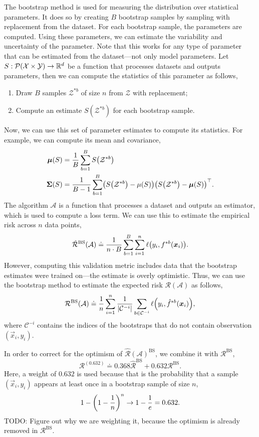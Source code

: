 The bootstrap method is used for measuring the distribution over statistical parameters. It does so
by creating $B$ bootstrap samples by sampling with replacement from the dataset. For each bootstrap
sample, the parameters are computed. Using these parameters, we can estimate the variability and
uncertainty of the parameter. Note that this works for any type of parameter that can be estimated
from the dataset---not only model parameters. Let $S: \mathcal{P}(\mathcal{X} \times \mathcal{Y})
    \to \mathbb{R}^d$ be a function that processes datasets and outputs parameters, then we can compute the
statistics of this parameter as follows,
\begin{enumerate}
    \item Draw $B$ samples $\mathcal{Z}^{*b}$ of size $n$ from $\mathcal{Z}$ with replacement;
    \item Compute an estimate $S(\mathcal{Z}^{*b})$ for each bootstrap sample.
\end{enumerate}
Now, we can use this set of parameter estimates to compute its statistics. For example, we can compute its mean and covariance,
\begin{align*}
    \vec{\mu}(S)    & = \frac{1}{B} \sum_{b=1}^{B} S\lft(\mathcal{Z}^{*b}\rgt)                                                                                             \\
    \mat{\Sigma}(S) & = \frac{1}{B-1} \sum_{b=1}^{B}  \lft( S\lft(\mathcal{Z}^{*b}\rgt) - \mu(S) \rgt) \transpose{\lft( S\lft(\mathcal{Z}^{*b}\rgt) - \vec{\mu}(S) \rgt)}.
\end{align*}
The algorithm $\mathcal{A}$ is a function that processes a dataset and outputs an estimator, which
is used to compute a loss term. We can use this to estimate the empirical risk across $n$ data
points, \[
    \hat{\mathcal{R}}^{\mathrm{BS}}(\mathcal{A}) \doteq \frac{1}{n \cdot B} \sum_{b=1}^{B} \sum_{i=1}^{n} \ell\lft(y_i, f^{*b}\lft(\vec{x}_i\rgt)\rgt).
\]
However, computing this validation metric includes data that the bootstrap estimates were trained
on---the estimate is overly optimistic. Thus, we can use the bootstrap method to estimate the
expected risk $\mathcal{R}(\mathcal{A})$ as follows, \[
    \mathcal{R}^{\mathrm{BS}}(\mathcal{A}) \doteq \frac{1}{n} \sum_{i=1}^{n} \frac{1}{|\mathcal{C}^{-i}|} \sum_{b \in \mathcal{C}^{-i}} \ell\lft(y_i, \hat{f}^{*b}\lft(\vec{x}_i\rgt)\rgt),
\]
where $\mathcal{C}^{-i}$ contains the indices of the bootstraps that do not contain observation
$(\vec{x}_i, y_i)$.

In order to correct for the optimism of $\hat{\mathcal{R}}(\mathcal{A})^{\mathrm{BS}}$, we combine
it with $\mathcal{R}^{\mathrm{BS}}$, \[
    \mathcal{R}^{(0.632)} \doteq 0.368 \hat{\mathcal{R}}^{\mathrm{BS}} + 0.632 \mathcal{R}^{\mathrm{BS}}.
\]
Here, a weight of $0.632$ is used because that is the probability that a sample $(\vec{x}_i, y_i)$
appears at least once in a bootstrap sample of size $n$, \[
    1 - \lft( 1 - \frac{1}{n} \rgt)^n \to 1 - \frac{1}{e} = 0.632.
\]
TODO: Figure out why we are weighting it, because the optimism is already removed in
$\mathcal{R}^{\mathrm{BS}}$.

